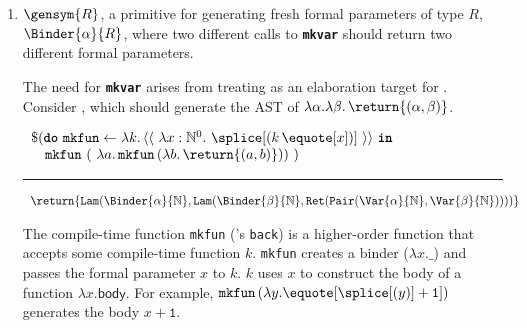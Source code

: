 \begin{enumerate}

\item $\gensym{R}$, a primitive for generating fresh formal parameters of type $R$, $\Binder{\alpha}{R}$, where two different calls to \textbf{\texttt{mkvar}} should return two different formal parameters.

The need for \textbf{\texttt{mkvar}} arises from treating \coreLang{} as an elaboration target for \sourceLang{}. Consider , which should generate the AST of $\lambda \alpha. \lambda \beta. \, \return{(\alpha, \beta)}$.

\begin{minipage}[t]{\linewidth}
\begin{sourcelst}
$\begin{array}{l}
\$(\textbf{\texttt{do}} \, \, \texttt{mkfun} \leftarrow {\lambda k. \, {\langle\langle\,\, \lambda x: \mathbb{N}^0. \,\, \splice[(k \, {\equote[x]})]\,\, \rangle\rangle}} \, \, \textbf{\texttt{in}} \\
\quad \texttt{mkfun} \,\, (\,\, \lambda a. \, \texttt{mkfun} \, (\lambda b. \, \return{(a, b)})) \,\, )
\end{array}$

\vspace{2mm} 
\textcolor{sourceComment}{\hrule height 0.2mm \relax}
\vspace{2mm} 

\textcolor{sourceComment}{$\begin{array}{l}\return{\texttt{Lam}(\Binder{\alpha}{\mathbb{N}}, \texttt{Lam}(\Binder{\beta}{\mathbb{N}}, \texttt{Ret}(\texttt{Pair}(\Var{\alpha}{\mathbb{N}}, \Var{\beta}{\mathbb{N}}))))}\end{array}$}
\end{sourcelst}
%
\label{listing:source-gensym}
\end{minipage}
\par\vspace{0.6\baselineskip}
The compile-time function \texttt{mkfun} (\citeauthor{taha-1999}'s \citep{taha-1999} \texttt{back}) is a higher-order function that accepts some compile-time function $k$. \texttt{mkfun} creates a binder ($\lambda x. \_$) and passes the formal parameter $x$ to $k$. $k$ uses $x$ to construct the \textsf{body} of a function $\lambda x. \textsf{body}$. For example, $\texttt{mkfun} \,  (\lambda y. \equote[{\splice[(y)]} + \texttt{1}])$ generates the body $x + \texttt{1}$.


\end{enumerate}
